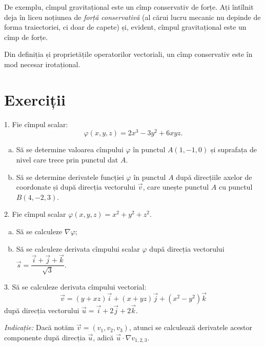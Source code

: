 De exemplu, cîmpul gravitațional este un cîmp conservativ de forțe. Ați întîlnit deja
în liceu noțiunea de \emph{forță conservativă} (al cărui lucru mecanic nu depinde de
forma traiectoriei, ci doar de capete) și, evident, cîmpul gravitațional este un cîmp
de forțe.


\begin{remark}\label{rk:cons-irot}
  Din definiția și proprietățile operatorilor vectoriali, un cîmp conservativ
  este în mod necesar irotațional.
\end{remark}


\section{Exerciții}

1. Fie cîmpul scalar:
\[
  \varphi(x, y, z) = 2x^3 - 3y^2 + 6xyz.
\]

\begin{enumerate}[(a)]
\item Să se determine valoarea cîmpului $ \varphi $ în punctul $ A(1, -1, 0) $ și
  suprafața de nivel care trece prin punctul dat $ A $.
\item Să se determine derivatele funcției $ \varphi $ în punctul $ A $ după direcțiile
  axelor de coordonate și după direcția vectorului $ \vec{v} $, care unește punctul
  $ A $ cu punctul $ B(4, -2, 3) $.
\end{enumerate}

\vspace{1cm}

2. Fie cîmpul scalar $ \varphi(x, y, z) = x^2 + y^2 + z^2 $.
\begin{enumerate}[(a)]
\item Să se calculeze $ \nabla \varphi $;
\item Să se calculeze derivata cîmpului scalar $ \varphi $ după direcția vectorului
  $ \vec{s} = \dfrac{\vec{i} + \vec{j} + \vec{k}}{\sqrt{3}} $.
\end{enumerate}

\vspace{1cm}

3. Să se calculeze derivata cîmpului vectorial:
\[
  \vec{v} = (y + xz)\vec{i} + (x + yz) \vec{j} + (x^2 - y^2) \vec{k}
\]
după direcția vectorului $ \vec{u} = \vec{i} + 2 \vec{j} + 2 \vec{k} $.

\emph{Indicație:} Dacă notăm $ \vec{v} = (v_1, v_2, v_3) $, atunci se calculează
derivatele acestor componente după direcția $ \vec{u} $, adică $ \vec{u} \cdot \nabla v_{1,2,3} $.

